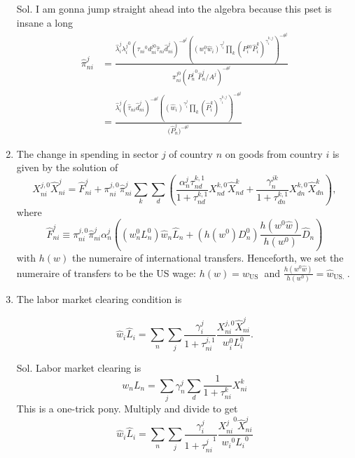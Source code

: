 \documentclass[12pt,oneside,reqno]{article}
\begin{document}
\begin{enumerate}[label=\roman*., leftmargin=*]
\begin{enumerate}
\item[Sol.] I am gonna jump straight ahead into the algebra because this pset is insane a long 
\begin{align*}
    \hat{\pi}_{ni}^j &= \frac{\hat{\lambda}_i^j {\lambda_i^j}^0 \left({\tau_{ni}}^0d_{ni}^{j0}\hat{\tau}_{ni}\hat{d}_{ni}^j\right)^{-\theta^j} \left((w_i^0 \hat{w}_i)^{\gamma_i^j} \prod_k (P_i^{k0} \hat{P}_i^k)^{\gamma_i^{k,j}}\right)^{-\theta^j}}{\pi_{ni}^{j0}({P_n^j}^0 \hat{P}_n^j/A^j)^{-\theta^j}} \\
    &= \frac{\hat{\lambda}_i^j  \left(\hat{\tau}_{ni}\hat{d}_{ni}^j\right)^{-\theta^j} \left((\hat{w}_i)^{\gamma_i^j} \prod_k ( \hat{P}_i^k)^{\gamma_i^{k,j}}\right)^{-\theta^j}}{({ \hat{P}_n^j)^{-\theta^j}}}
\end{align*}

\item The change in spending in sector $j$ of country $n$ on goods from country $i$ is given by the solution of
\begin{equation*}
X_{n i}^{j, 0} \hat{X}_{n i}^{j}=\hat{F}_{n i}^{j}+\pi_{n i}^{j, 0} \hat{\pi}_{n i}^{j} \sum_{k} \sum_{d}\left(\frac{\alpha_{n}^{j} \tau_{n d}^{k, 1}}{1+\tau_{n d}^{k, 1}} X_{n d}^{k, 0} \hat{X}_{n d}^{k}+\frac{\gamma_{n}^{j k}}{1+\tau_{d n}^{k, 1}} X_{d n}^{k, 0} \hat{X}_{d n}^{k}\right),
\end{equation*}
where
\begin{equation*}
\hat{F}_{n i}^{j} \equiv \pi_{n i}^{j, 0} \hat{\pi}_{n i}^{j} \alpha_{n}^{j}\left(\left(w_{n}^{0} L_{n}^{0}\right) \hat{w}_{n} \hat{L}_{n}+\left(h\left(w^{0}\right) D_{n}^{0}\right) \frac{h\left(w^{0} \hat{w}\right)}{h\left(w^{0}\right)} \hat{D}_{n}\right)
\end{equation*}
with $h(w)$ the numeraire of international transfers. Henceforth, we set the numeraire of transfers to be the US wage: $h(w)=w_{\text {US }}$ and $\frac{h\left(w^{0} \hat{w}\right)}{h\left(w^{0}\right)}=\hat{w}_{\text {US. }}$.

\item The labor market clearing condition is

\begin{equation*}
\hat{w}_{i} \hat{L}_{i}=\sum_{n} \sum_{j} \frac{\gamma_{i}^{j}}{1+\tau_{n i}^{j, 1}} \frac{X_{n i}^{j, 0} \hat{X}_{n i}^{j}}{w_{i}^{0} L_{i}^{0}} .
\end{equation*}
\item[Sol.] Labor market clearing is
\begin{equation*}
    w_n L_n = \sum_j \gamma_n^j \sum_d \frac{1}{1+\tau_{ni}^k} X_{ni}^k 
\end{equation*}
This is a one-trick pony. Multiply and divide to get 
\begin{equation*}
    \hat{w}_i \hat{L}_i = \sum_n \sum_j \frac{\gamma_i^j}{1+{\tau_{ni}^j}^1} \frac{{X_{ni}^j}^0 \hat{X}_{ni}^j}{{w_i}^0{L_i}^0}
\end{equation*}


\end{enumerate}
\end{enumerate}
\end{document}

